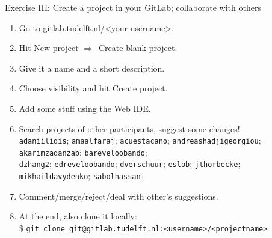 \documentclass[aspectratio=169]{beamer}
\newcommand{\dra}{\ensuremath{\Rightarrow }~}
\newcommand{\code}[1]{\texttt{\color{mygreen}#1}}
\begin{document}
\begin{frame}
  {Exercise III: Create a project in your GitLab; collaborate with others}

  \begin{enumerate}\itemsep0.2cm
    \item Go to \href{https://gitlab.tudelft.nl/dieterwerthmul}%
        {gitlab.tudelft.nl/<your-username>}.
    \item Hit \alert{New project} \dra \alert{Create blank project}.
    \item Give it a name and a short description.
    \item Choose visibility and hit \alert{Create project}.
    \item Add some stuff using the Web IDE.
    \item \alert{Search projects of other participants, suggest some changes!}\\
  {\scriptsize \texttt{adaniilidis}; \texttt{amaalfaraj}; \texttt{acuestacano};
  \texttt{andreashadjigeorgiou}; \texttt{akarimzadanzab};
  \texttt{bareveloobando};\\[-.9em] \texttt{dzhang2}; \texttt{edreveloobando};
  \texttt{dverschuur}; \texttt{eslob}; \texttt{jthorbecke};
  \texttt{mikhaildavydenko}; \texttt{sabolhassani}}
    \item Comment/merge/reject/deal with other's suggestions.
    \item At the end, also clone it locally:\\
      \$ \code{git clone git@gitlab.tudelft.nl:<username>/<projectname>}
  \end{enumerate}

\end{frame}
\end{document}
